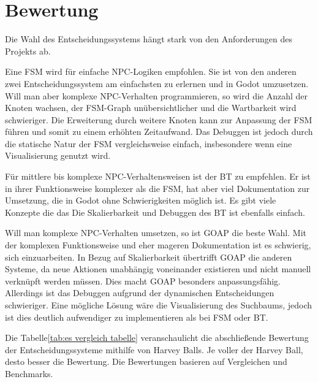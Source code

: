 \section{Bewertung}
\label{chap:bewertung}

Die Wahl des Entscheidungssystems h\"{a}ngt stark von den Anforderungen des Projekts ab.

Eine FSM wird f\"{u}r einfache NPC-Logiken empfohlen. Sie ist von den anderen zwei Entscheidungssystem am einfachsten zu erlernen und in Godot umzusetzen. Will man aber komplexe NPC-Verhalten programmieren, so wird die Anzahl der Knoten wachsen, der FSM-Graph un\"{u}bersichtlicher und die Wartbarkeit wird schwieriger. Die Erweiterung durch weitere Knoten kann zur Anpassung der FSM f\"{u}hren und somit zu einem erh\"{o}hten Zeitaufwand. Das Debuggen ist jedoch durch die statische Natur der FSM vergleichsweise einfach, insbesondere wenn eine Visualisierung genutzt wird.

F\"{u}r mittlere bis komplexe NPC-Verhaltensweisen ist der BT zu empfehlen. Er ist in ihrer Funktionsweise komplexer als die FSM, hat aber viel Dokumentation zur Umsetzung, die in Godot ohne Schwierigkeiten m\"{o}glich ist. Es gibt viele Konzepte die das 
Die Skalierbarkeit und Debuggen des BT ist ebenfalls einfach.

Will man komplexe NPC-Verhalten umsetzen, so ist GOAP die beste Wahl. Mit der komplexen Funktionsweise und eher mageren Dokumentation ist es schwierig, sich einzuarbeiten. In Bezug auf Skalierbarkeit \"{u}bertrifft GOAP die anderen Systeme, da neue Aktionen unabh\"{a}ngig voneinander existieren und nicht manuell verkn\"{u}pft werden m\"{u}ssen. Dies macht GOAP besonders anpassungsf\"{a}hig. Allerdings ist das Debuggen aufgrund der dynamischen Entscheidungen schwieriger. Eine m\"{o}gliche L\"{o}sung w\"{a}re die Visualisierung des Suchbaums, jedoch ist dies deutlich aufwendiger zu implementieren als bei FSM oder BT.

Die Tabelle\ref{tab:es vergleich tabelle} veranschaulicht die abschlie\ss{}ende Bewertung der Entscheidungssysteme mithilfe von Harvey Balls. Je voller der Harvey Ball, desto besser die Bewertung. Die Bewertungen basieren auf Vergleichen und Benchmarks.


